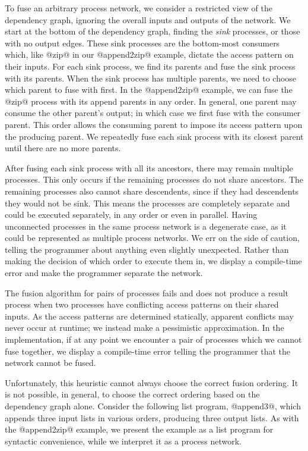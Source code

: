 To fuse an arbitrary process network, we consider a restricted view of the dependency graph, ignoring the overall inputs and outputs of the network.
We start at the bottom of the dependency graph, finding the \emph{sink} processes, or those with no output edges.
These sink processes are the bottom-most consumers which, like @zip@ in our @append2zip@ example, dictate the access pattern on their inputs.
For each sink process, we find its parents and fuse the sink process with its parents.
When the sink process has multiple parents, we need to choose which parent to fuse with first.
In the @append2zip@ example, we can fuse the @zip@ process with its append parents in any order.
In general, one parent may consume the other parent's output; in which case we first fuse with the consumer parent.
This order allows the consuming parent to impose its access pattern upon the producing parent.
We repeatedly fuse each sink process with its closest parent until there are no more parents.

After fusing each sink process with all its ancestors, there may remain multiple processes.
This only occurs if the remaining processes do not share ancestors.
The remaining processes also cannot share descendents, since if they had descendents they would not be sink.
This means the processes are completely separate and could be executed separately, in any order or even in parallel.
Having unconnected processes in the same process network is a degenerate case, as it could be represented as multiple process networks.
We err on the side of caution, telling the programmer about anything even slightly unexpected.
Rather than making the decision of which order to execute them in, we display a compile-time error and make the programmer separate the network.

The fusion algorithm for pairs of processes fails and does not produce a result process when two processes have conflicting access patterns on their shared inputs.
As the access patterns are determined statically, apparent conflicts may never occur at runtime; we instead make a pessimistic approximation.
In the implementation, if at any point we encounter a pair of processes which we cannot fuse together, we display a compile-time error telling the programmer that the network cannot be fused.

Unfortunately, this heuristic cannot always choose the correct fusion ordering.
It is not possible, in general, to choose the correct ordering based on the dependency graph alone.
Consider the following list program, @append3@, which appends three input lists in various orders, producing three output lists.
As with the @append2zip@ example, we present the example as a list program for syntactic convenience, while we interpret it as a process network.

